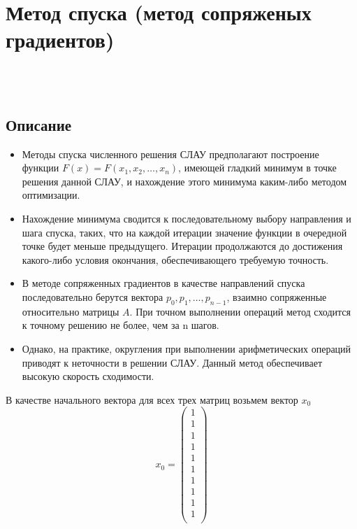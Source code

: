 \documentclass[../../report.tex]{subfiles}
\begin{document}
\chapter{Метод спуска (метод сопряженых градиентов)}
\\
\\

\section{Описание}
\begin{itemize}
  \item Методы спуска численного решения СЛАУ предполагают построение функции $F(x)=F(x_1, x_2, \dots, x_n)$, 
имеющей гладкий минимум в точке решения данной СЛАУ, и нахождение этого
минимума каким-либо методом оптимизации.

  \item Нахождение минимума сводится к последовательному выбору направления и шага спуска, таких, что на каждой итерации значение
функции в очередной точке будет меньше предыдущего. Итерации продолжаются до достижения
какого-либо условия окончания, обеспечивающего требуемую точность.

  \item В методе сопряженных градиентов в качестве направлений спуска последовательно берутся
вектора $p_0, p_1, \dots, p_{n-1}$, взаимно сопряженные относительно матрицы $A$. При точном выполнении
операций метод сходится к точному решению не более, чем за n шагов. 

  \item Однако, на практике, округления при выполнении арифметических операций приводят к неточности в решении СЛАУ.
Данный метод обеспечивает высокую скорость сходимости.
\end{itemize}

В качестве начального вектора для всех трех матриц возьмем вектор $x_0$
\[
x_0 =
\begin{pmatrix}
  1 \\
  1 \\
  1 \\
  1 \\
  1 \\
  1 \\
  1 \\
  1 \\
  1 \\
  1 \\
\end{pmatrix}
\]
\end{document}
